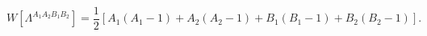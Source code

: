 \begin{equation}
W[\Lambda^{A_1A_2B_1B_2}]
=\frac{1}{2}[A_1(A_1-1)+A_2(A_2-1)+B_1(B_1-1)+B_2(B_2-1)].
\end{equation}

